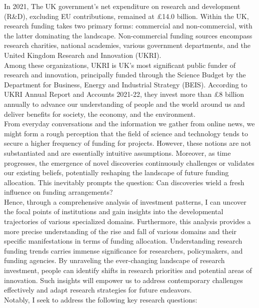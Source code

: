 In 2021, The UK government’s net expenditure on research and development (R\&D), excluding EU contributions, remained at \pounds14.0 billion. Within the UK, research funding takes two primary forms: commercial and non-commercial, with the latter dominating the landscape. Non-commercial funding sources encompass research charities, national academies, various government departments, and the United Kingdom Research and Innovation (UKRI).\\

Among these organizations, UKRI is UK's most significant public funder of research and innovation, principally funded through the Science Budget by the Department for Business, Energy and Industrial Strategy (BEIS). According to UKRI Annual Report and Accounts 2021-22, they invest more than £8 billion annually to advance our understanding of people and the world around us and deliver benefits for society, the economy, and the environment. \\

From everyday conversations and the information we gather from online news, we might form a rough perception that the field of science and technology tends to secure a higher frequency of funding for projects. However, these notions are not substantiated and are essentially intuitive assumptions. Moreover, as time progresses, the emergence of novel discoveries continuously challenges or validates our existing beliefs, potentially reshaping the landscape of future funding allocation. This inevitably prompts the question: Can discoveries wield a fresh influence on funding arrangements?\\

Hence, through a comprehensive analysis of investment patterns, I can uncover the focal points of institutions and gain insights into the developmental trajectories of various specialized domains. Furthermore, this analysis provides a more precise understanding of the rise and fall of various domains and their specific manifestations in terms of funding allocation. Understanding research funding trends carries immense significance for researchers, policymakers, and funding agencies. By unraveling the ever-changing landscape of research investment, people can identify shifts in research priorities and potential areas of innovation. Such insights will empower us to address contemporary challenges effectively and adapt research strategies for future endeavors.\\

Notably, I seek to address the following key research questions:

